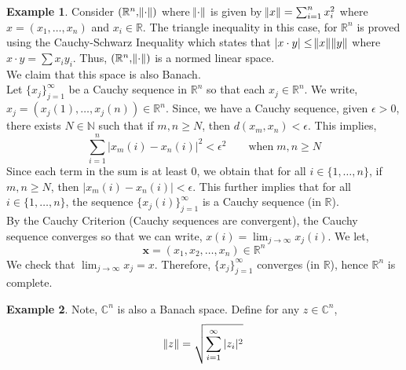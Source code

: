 \documentclass[a4paper, 11pt]{book}
\theoremstyle{definition}
\newtheorem*{example}{Example}
\theoremstyle{remark}
\begin{document}
    \begin{example}
        Consider $(\mathbb{R}^n,\norm{\cdot})$ where $\norm{\cdot}$ is given by $\norm{x} = \sum_{i=1}^n x_i^2$ where 
        $x = (x_1,\hdots,x_n)$ and $x_i\in\mathbb{R}$. The triangle inequality in this case, for $\mathbb{R}^n$ is proved
        using the Cauchy-Schwarz Inequality which states that $|x\cdot y| \leq \norm{x}\norm{y}$ where $x\cdot y = \sum x_iy_i$.
        Thus, $(\mathbb{R}^n,\norm{\cdot})$ is a normed linear space.\\

        We claim that this space is also Banach.\\

        Let $\{x_j\}_{j=1}^{\infty}$ be a Cauchy sequence in $\mathbb{R}^n$ so that each $x_j\in\mathbb{R}^n$. We write,
        $x_j = (x_j(1),\hdots,x_j(n))\in\mathbb{R}^n$. Since, we have a Cauchy sequence, given $\epsilon>0$, there exists
        $N\in\mathbb{N}$ such that if $m,n\geq N$, then $d(x_m,x_n)<\epsilon$. This implies,
        \[ \sum_{i=1}^n |x_m(i) - x_n(i)|^2 < \epsilon^2 \qquad\text{when}\;m,n\geq N \]
        Since each term in the sum is at least 0, we obtain that for all $i\in\{1,\hdots,n\}$, 
        if $m,n\geq N$, then $|x_m(i)-x_n(i)| < \epsilon$. This further implies that for all $i\in\{1,\hdots,n\}$, the sequence
        $\{x_j(i)\}_{j=1}^{\infty}$ is a Cauchy sequence (in $\mathbb{R}$).\\
        By the Cauchy Criterion (Cauchy sequences are convergent), the Cauchy sequence converges so that we can write,
        $x(i) = \lim_{j\to\infty} x_j(i)$. We let,
        \[ \mathbf{x} = (x_1,x_2,\hdots,x_n)\in\mathbb{R}^n \]
        We check that $\lim_{j\to\infty} x_j = x$. Therefore, $\{x_j\}_{j=1}^{\infty}$ converges (in $\mathbb{R}$), hence
        $\mathbb{R}^n$ is complete.
    \end{example}

    \begin{example}
        Note, $\mathbb{C}^n$ is also a Banach space. Define for any $z\in\mathbb{C}^n$,
        \[ \norm{z} = \sqrt{\sum_{i=1}^{\infty} |z_i|^2} \]
    \end{example}
\end{document}
